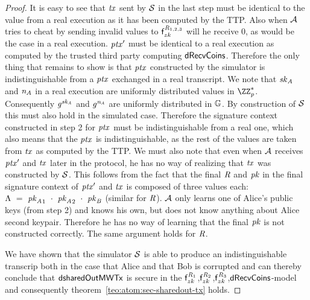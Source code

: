 \begin{proof}
    It is easy to see that $\mathit{tx}$ sent by $\mathcal{S}$ in the last step must be identical to the value from a real execution as it has been computed by the TTP.
    Also when $\mathcal{A}$ tries to cheat by sending invalid values to $\mathsf{f}^{\mathit{R}_{1,2,3}}_{zk}$ will he receive 0, as would be the case in a real execution.
    ${\mathit{ptx}}'$ must be identical to a real execution as computed by the trusted third party computing $\mathsf{dRecvCoins}$.
    Therefore the only thing that remains to show is that $\mathit{ptx}$ constructed by the simulator is indistinguishable from a $\mathit{ptx}$ exchanged in a real transcript.
    We note that $\mathit{sk}_{\mathit{A}}$ and $\mathit{\mathit{n}_{\mathit{A}}}$ in a real execution are uniformly distributed values in $\cnstIntegersPrimeWithoutZero{\varPrime}$.
    Consequently $\mathit{g}^{\mathit{sk}_{\mathit{A}}}$ and $\mathit{g}^{\mathit{\mathit{n}_{\mathit{A}}}}$ are uniformly distributed in $\mathbb{G}$.
    By construction of $\mathcal{S}$ this must also hold in the simulated case.
    Therefore the signature context constructed in step 2 for $\mathit{ptx}$ must be indistinguishable from a real one, which also means that the $\mathit{ptx}$ is indistinguishable, as the rest of the values are taken from $\mathit{tx}$ as computed by the TTP.
    We must also note that even when $\mathcal{A}$ receives ${\mathit{ptx}}'$ and $\mathit{tx}$ later in the protocol, he has no way of realizing that $\mathit{tx}$ was constructed by $\mathcal{S}$.
    This follows from the fact that the final $\mathit{R}$ and $\mathit{pk}$ in the final signature context of ${\mathit{ptx}}'$ and $\mathit{tx}$ is composed of three values each:
    $\Lambda ~=~ {\mathit{pk}_{\mathit{A}}}_1 ~\cdot~ {\mathit{pk}_{\mathit{A}}}_2 ~\cdot~ {\mathit{pk}_{\mathit{B}}}$ (similar for $\mathit{R}$).
    $\mathcal{A}$ only learns one of Alice's public keys (from step 2) and knows his own, but does not know anything about Alice second keypair.
    Therefore he has no way of learning that the final $\mathit{pk}$ is not constructed correctly.
    The same argument holds for $\mathit{R}$.

    We have shown that the simulator $\mathcal{S}$ is able to produce an indistinguishable transcrip both in the case that Alice and that Bob is corrupted and can thereby conclude that $\mathsf{dsharedOutMWTx}$ is secure in the $\mathsf{f}^{\mathit{R}_1}_{zk}$,$\mathsf{f}^{\mathit{R}_2}_{zk}$,$\mathsf{f}^{\mathit{R}_3}_{zk}$,$\mathsf{dRecvCoins}$-model and consequently theorem~\ref{teo:atom:sec-sharedout-tx} holds.
\end{proof}

